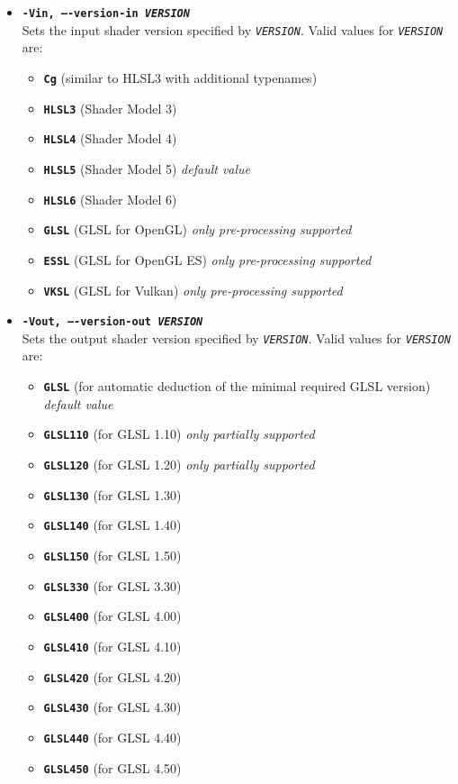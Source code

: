 \documentclass{article}
\begin{document}
\begin{itemize}
	\item[] \textbf{\texttt{-Vin, ----version-in \textit{VERSION}}} \\
	Sets the input shader version specified by \texttt{\textit{VERSION}}.
	Valid values for \texttt{\textit{VERSION}} are:
	\begin{itemize}
		\item[] \textbf{\texttt{Cg}} (similar to HLSL3 with additional typenames)
		\item[] \textbf{\texttt{HLSL3}} (Shader Model 3)
		\item[] \textbf{\texttt{HLSL4}} (Shader Model 4)
		\item[] \textbf{\texttt{HLSL5}} (Shader Model 5) \textit{default value}
		\item[] \textbf{\texttt{HLSL6}} (Shader Model 6)
		\item[] \textbf{\texttt{GLSL}} (GLSL for OpenGL) \textit{only pre-processing supported}
		\item[] \textbf{\texttt{ESSL}} (GLSL for OpenGL ES) \textit{only pre-processing supported}
		\item[] \textbf{\texttt{VKSL}} (GLSL for Vulkan) \textit{only pre-processing supported}
	\end{itemize}
	
	\item[] \textbf{\texttt{-Vout, ----version-out \textit{VERSION}}} \\
	Sets the output shader version specified by \texttt{\textit{VERSION}}.
	Valid values for \texttt{\textit{VERSION}} are:
	\begin{itemize}
		\item[] \textbf{\texttt{GLSL}} (for automatic deduction of the minimal required GLSL version) \textit{default value}
		\item[] \textbf{\texttt{GLSL110}} (for GLSL 1.10) \textit{only partially supported}
		\item[] \textbf{\texttt{GLSL120}} (for GLSL 1.20) \textit{only partially supported}
		\item[] \textbf{\texttt{GLSL130}} (for GLSL 1.30)
		\item[] \textbf{\texttt{GLSL140}} (for GLSL 1.40)
		\item[] \textbf{\texttt{GLSL150}} (for GLSL 1.50)
		\item[] \textbf{\texttt{GLSL330}} (for GLSL 3.30)
		\item[] \textbf{\texttt{GLSL400}} (for GLSL 4.00)
		\item[] \textbf{\texttt{GLSL410}} (for GLSL 4.10)
		\item[] \textbf{\texttt{GLSL420}} (for GLSL 4.20)
		\item[] \textbf{\texttt{GLSL430}} (for GLSL 4.30)
		\item[] \textbf{\texttt{GLSL440}} (for GLSL 4.40)
		\item[] \textbf{\texttt{GLSL450}} (for GLSL 4.50)
	\end{itemize}
	
\end{itemize}
\end{document}
